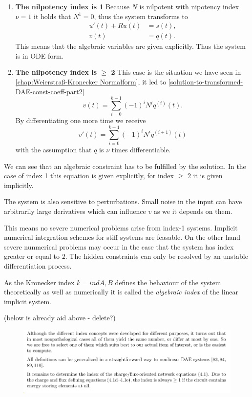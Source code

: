 \begin{enumerate}
	\item \textbf{The nilpotency index is 1} \newline
		Because $N$ is nilpotent with nipotency index $\nu = 1$ it holds that $N^1 = 0$, thus the system transforms to
		\begin{align*}
			u'(t) + Ru(t) &= s(t), \\
			v(t) &= q(t).
		\end{align*}
		This means that the algebraic variables are given explicitly. Thus the system is in ODE form.

	\item \textbf{The nilpotency index is $\geq$ 2} \newline
		This case is the situation we have seen in \ref{chap:Weierstraß-Kronecker Normalform}, it led to \ref{solution-to-transformed-DAE-const-coeff-part2}
		\begin{displaymath}
			v(t) = \sum_{i=0}^{k-1} (-1)^iN^iq^{(i)}(t).
		\end{displaymath}
		By differentiating one more time we receive
		\begin{equation}
			v'(t) = \sum_{i=0}^{k-1} (-1)^iN^iq^{(i+1)}(t)
		\end{equation}
		with the assumption that $q$ is $\nu$ times differentiable.
\end{enumerate}

We can see that an algebraic constraint has to be fulfilled by the solution. In the case of index 1 this equation is given explicitly, for index $\geq$ 2 it is given implicitly.

The system is also sensitive to perturbations. Small noise in the input can have arbitrarily large derivatives which can influence $v$ as we it depends on them.

This means no severe numerical problems arise from index-1 systems. Implicit numerical integration schemes for stiff systems are feasable. On the other hand severe nunmerical problems may occur in the case that the system has index greater or equal to $2$. The hidden constraints can only be resolved by an unstable differentiation process.

As the Kronecker index $k=ind{A,B}$ defines the behaviour of the system theoretically as well as numerically it is called the \emph{algebraic index} of the linear implicit system.


(below is already aid above - delete?)
\begin{figure}[H]
	\centering
	\includegraphics[width=0.7\linewidth]{screenshot022}
	\caption{}
	\label{fig:screenshot022}
\end{figure}


